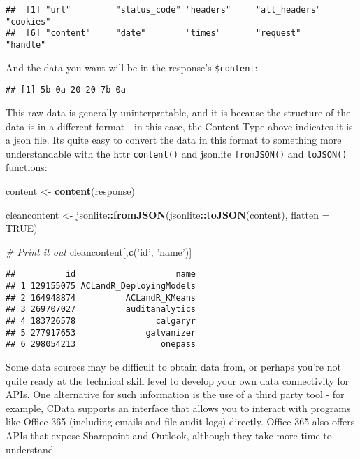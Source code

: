 \documentclass[
]{book}
\newenvironment{Shaded}{\begin{snugshade}}{\end{snugshade}}
\newcommand{\CommentTok}[1]{\textcolor[rgb]{0.56,0.35,0.01}{\textit{#1}}}
\newcommand{\DataTypeTok}[1]{\textcolor[rgb]{0.13,0.29,0.53}{#1}}
\newcommand{\KeywordTok}[1]{\textcolor[rgb]{0.13,0.29,0.53}{\textbf{#1}}}
\newcommand{\NormalTok}[1]{#1}
\newcommand{\OperatorTok}[1]{\textcolor[rgb]{0.81,0.36,0.00}{\textbf{#1}}}
\newcommand{\OtherTok}[1]{\textcolor[rgb]{0.56,0.35,0.01}{#1}}
\newcommand{\StringTok}[1]{\textcolor[rgb]{0.31,0.60,0.02}{#1}}
\begin{document}
\begin{verbatim}
##  [1] "url"         "status_code" "headers"     "all_headers" "cookies"    
##  [6] "content"     "date"        "times"       "request"     "handle"
\end{verbatim}

And the data you want will be in the response's \texttt{\$content}:

\begin{Shaded}
\end{Shaded}

\begin{verbatim}
## [1] 5b 0a 20 20 7b 0a
\end{verbatim}

This raw data is generally uninterpretable, and it is because the structure of the data is in a different format - in this case, the Content-Type above indicates it is a json file. Its quite easy to convert the data in this format to something more understandable with the httr \texttt{content()} and jsonlite \texttt{fromJSON()} and \texttt{toJSON()} functions:

\begin{Shaded}
\begin{Highlighting}[]
\NormalTok{content <-}\StringTok{ }\KeywordTok{content}\NormalTok{(response)}

\NormalTok{cleancontent <-}\StringTok{ }\NormalTok{jsonlite}\OperatorTok{::}\KeywordTok{fromJSON}\NormalTok{(jsonlite}\OperatorTok{::}\KeywordTok{toJSON}\NormalTok{(content), }\DataTypeTok{flatten =} \OtherTok{TRUE}\NormalTok{)}

\CommentTok{# Print it out}
\NormalTok{cleancontent[,}\KeywordTok{c}\NormalTok{(}\StringTok{'id'}\NormalTok{, }\StringTok{'name'}\NormalTok{)]}
\end{Highlighting}
\end{Shaded}

\begin{verbatim}
##          id                    name
## 1 129155075 ACLandR_DeployingModels
## 2 164948874          ACLandR_KMeans
## 3 269707027          auditanalytics
## 4 183726578                calgaryr
## 5 277917653              galvanizer
## 6 298054213                 onepass
\end{verbatim}

Some data sources may be difficult to obtain data from, or perhaps you're not quite ready at the technical skill level to develop your own data connectivity for APIs. One alternative for such information is the use of a third party tool - for example, \href{https://www.cdata.com/kb/tech/office365-jdbc-r.rst}{CData} supports an interface that allows you to interact with programs like Office 365 (including emails and file audit logs) directly. Office 365 also offers APIs that expose Sharepoint and Outlook, although they take more time to understand.
\end{document}
